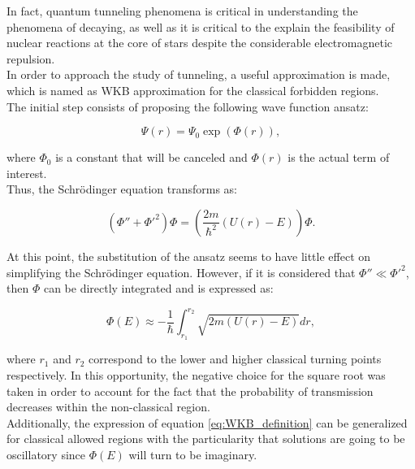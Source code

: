 \documentclass[openany]{book}
\begin{document}
In fact, quantum tunneling phenomena is critical in understanding the phenomena of decaying, as well as it is critical to the explain the feasibility of nuclear reactions at the core of stars despite the considerable electromagnetic repulsion. \\

In order to approach the study of tunneling, a useful approximation is made, which is named as WKB approximation for the classical forbidden regions. \\

The initial step consists of proposing the following wave function ansatz: 

\begin{equation} \label{eq:WKB_ansatz}
	\Psi(r) = \Psi_0\exp{(\Phi(r))},
\end{equation}

where $\Phi_0$ is a constant that will be canceled and $\Phi(r)$ is the actual term of interest. \\

Thus, the Schrödinger equation transforms as: 

\begin{equation} \label{eq:WKB_schrodinger}
	\left(\Phi'' + \Phi'^{2} \right)\Phi = \left(\frac{2m}{\hbar^2} (U(r) - E)\right) \Phi.
\end{equation}

At this point, the substitution of the ansatz seems to have little effect on simplifying the Schrödinger equation. However,  if it is considered that $\Phi'' \ll \Phi'^{2}$, then $\Phi$ can be directly integrated and is expressed as:

\begin{equation} \label{eq:WKB_definition}
	\Phi(E) \approx -\frac{1}{\hbar}\int_{r_1}^{r_2} {\sqrt{2m(U(r)-E)}} dr,
\end{equation}

where $r_1$ and $r_2$ correspond to the lower and higher classical turning points respectively. In this opportunity, the negative choice for the square root was taken in order to account for the fact that the probability of transmission decreases within the non-classical region. \\

Additionally, the expression of equation \ref{eq:WKB_definition} can be generalized for classical allowed regions with the particularity that solutions are going to be oscillatory since $\Phi(E)$ will turn to be imaginary. \\
\end{document}
